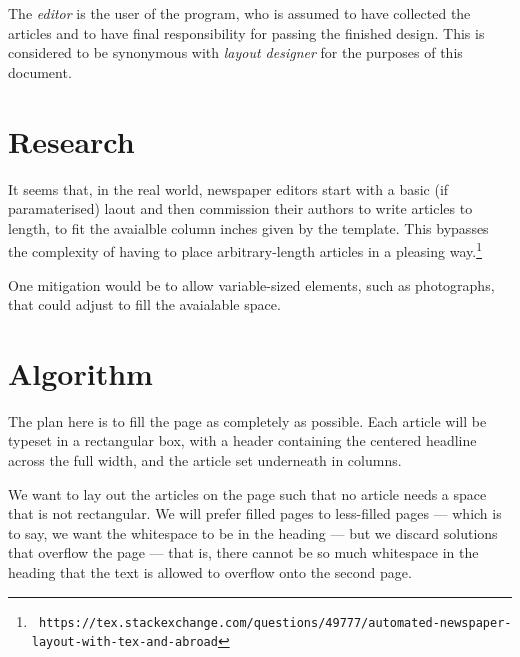 \documentclass[a4paper]{scrartcl}
\begin{document}
The \textit{editor} is the user of the program, who is assumed to have
collected the articles and to have final responsibility for passing
the finished design. This is considered to be synonymous with
\textit{layout designer} for the purposes of this document.

\section{Research}

It seems that, in the real world, newspaper editors start with a basic
(if paramaterised) laout and then commission their authors to write
articles to length, to fit the avaialble column inches given by the
template. This bypasses the complexity of having to place
arbitrary-length articles in a pleasing way.\footnote{\texttt{\tiny
    https://tex.stackexchange.com/questions/49777/automated-newspaper-layout-with-tex-and-abroad}}

One mitigation would be to allow variable-sized elements, such as
photographs, that could adjust to fill the avaialable space.


\section{Algorithm}

The plan here is to fill the page as completely as possible. Each
article will be typeset in a rectangular box, with a header containing
the centered headline across the full width, and the article set
underneath in columns.

We want to lay out the articles on the page such that no article needs
a space that is not rectangular. We will prefer filled pages to
less-filled pages --- which is to say, we want the whitespace to be in
the heading --- but we discard solutions that overflow the page ---
that is, there cannot be so much whitespace in the heading that the
text is allowed to overflow onto the second page.
\end{document}
